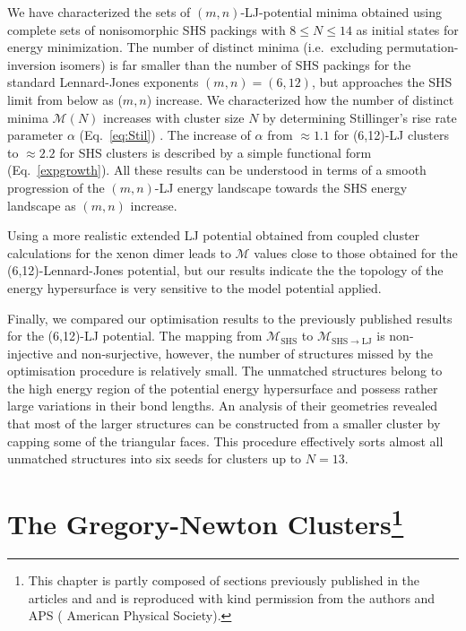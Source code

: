 We have characterized the sets of $(m,n)$-LJ-potential minima obtained using
complete sets of nonisomorphic \ac{SHS} packings with $8 \leq N \leq 14$
\autocite{Arkus_Minimalenergyclusters_2009,Arkus_DerivingFiniteSphere_2011,Hoy_Structurefinitesphere_2012,Hoy_Structuredynamicsmodel_2015,Holmes-Cerfon_EnumeratingRigidSphere_2016}
as initial states for energy minimization.  The number of distinct minima
(i.e.~excluding permutation-inversion isomers) is far smaller than the number
of \ac{SHS} packings for the standard Lennard-Jones exponents $(m,n) = (6,12)$, but
approaches the \ac{SHS} limit from below as ($m,n$) increase.  We characterized how
the number of distinct minima $\mathcal{M}(N)$ increases with cluster size $N$
by determining Stillinger's rise rate parameter $\alpha$ (Eq.\ \ref{eq:Stil})
\autocite{Stillinger_Exponentialmultiplicityinherent_1999}.  The increase of
$\alpha$ from $\approx 1.1$ for (6,12)-LJ clusters to $\approx 2.2$ for \ac{SHS}
clusters is described by a simple functional form (Eq.\ \ref{expgrowth}).  All
these results  can be understood in terms of a smooth progression of the
$(m,n)$-LJ energy landscape towards the \ac{SHS} energy landscape as $(m,n)$
increase.

Using a more realistic extended LJ potential obtained from coupled cluster
calculations for the xenon dimer
\autocite{Schwerdtfeger_ExtensionLennardJonespotential_2006,Jerabek_relativisticcoupledclusterinteraction_2017}
leads to $\mathcal{M}$ values close to those obtained for the
(6,12)-Lennard-Jones potential, but our results indicate the the topology of
the energy hypersurface is very sensitive to the model potential applied.  

Finally, we compared our optimisation results to the previously published
results for the (6,12)-LJ potential. The mapping from $\mathcal{M}_\text{SHS}$
to $\mathcal{M}_\mathrm{SHS\to LJ}$ is non-injective and non-surjective,
however, the number of structures missed by the optimisation procedure is
relatively small. The unmatched structures belong to the high energy region of
the potential energy hypersurface and possess rather large variations in their
bond lengths. An analysis of their geometries revealed that most of the larger
structures can be constructed from a smaller cluster by capping some of the
triangular faces. This procedure effectively sorts almost all unmatched
structures into six seeds for clusters up to $N=13$.


\chapter[The Gregory-Newton Clusters]{
    The Gregory-Newton Clusters\footnote{This chapter is partly composed of
    sections previously published in the articles
    \autocite{Trombach_stickyhardsphereLennardJonestypeclusters_2018}
    and
    \autocite{Trombach_GregoryNewtonProblemKissing_2018}
    and is reproduced with kind permission from the authors and APS
    ( American Physical Society).}
}
\label{sec:thegregorynewtonclusters}

